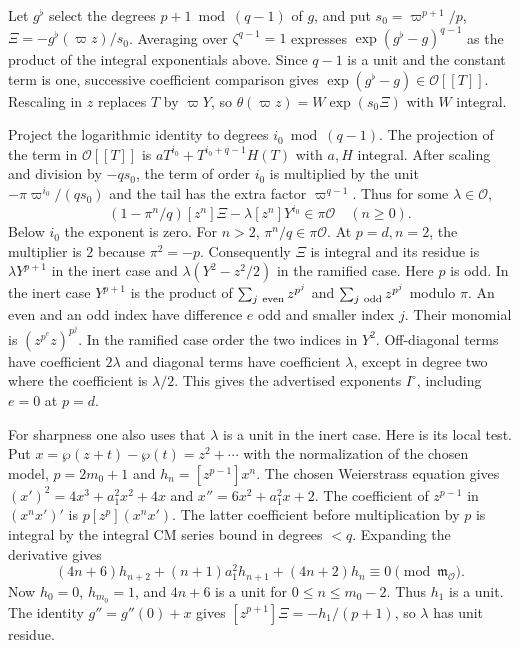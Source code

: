Let $g^\flat$ select the degrees $p+1\bmod(q-1)$ of $g$, and put
$s_0=\varpi^{p+1}/p$, $\Xi=-g^\flat(\varpi z)/s_0$.
Averaging over $\zeta^{q-1}=1$ expresses
$\exp(g^\flat-g)^{q-1}$ as the product of the integral exponentials above.
Since $q-1$ is a unit and the constant term is one, successive coefficient comparison gives $\exp(g^\flat-g)\in\mathcal O[[T]]$.
Rescaling in $z$ replaces $T$ by $\varpi Y$, so
$\theta(\varpi z)=W\exp(s_0\Xi)$ with $W$ integral.

Project the logarithmic identity to degrees $i_0\bmod(q-1)$.
The projection of the term in $\mathcal O[[T]]$ is $aT^{i_0}+T^{i_0+q-1}H(T)$ with $a,H$ integral. After scaling and division by $-qs_0$, the term of order $i_0$ is multiplied by the unit $-\pi\varpi^{i_0}/(qs_0)$ and the tail has the extra factor $\varpi^{q-1}$. Thus for some $\lambda\in\mathcal O$,
\[
 (1-\pi^n/q)[z^n]\Xi-\lambda[z^n]Y^{i_0}\in\pi\mathcal O
 \quad(n\ge0).
\]
Below $i_0$ the exponent is zero. For $n>2$, $\pi^n/q\in\pi\mathcal O$.
At $p=d,n=2$, the multiplier is $2$ because $\pi^2=-p$.
Consequently $\Xi$ is integral and its residue is
$\lambda Y^{p+1}$ in the inert case and $\lambda(Y^2-z^2/2)$ in the ramified case.
Here $p$ is odd. In the inert case $Y^{p+1}$ is the product of
$\sum_{j\ {\rm even}}z^{p^j}$ and $\sum_{j\ {\rm odd}}z^{p^j}$ modulo $\pi$.
An even and an odd index have difference $e$ odd and smaller index $j$.
Their monomial is $(z^{p^e}z)^{p^j}$. In the ramified case order the two indices in $Y^2$.
Off-diagonal terms have coefficient $2\lambda$ and diagonal terms have coefficient $\lambda$, except in degree two where the coefficient is $\lambda/2$.
This gives the advertised exponents $I^\circ$, including $e=0$ at $p=d$.

For sharpness one also uses that $\lambda$ is a unit in the inert case. Here is its local test.
Put $x=\wp(z+t)-\wp(t)=z^2+\cdots$ with the normalization of the chosen model,
$p=2m_0+1$ and $h_n=[z^{p-1}]x^n$. The chosen Weierstrass equation gives
$(x')^2=4x^3+a_1^2x^2+4x$ and $x''=6x^2+a_1^2x+2$.
The coefficient of $z^{p-1}$ in $(x^n x')'$ is $p[z^p](x^n x')$.
The latter coefficient before multiplication by $p$ is integral by the integral CM series bound in degrees $<q$. Expanding the derivative gives
\[
 (4n+6)h_{n+2}+(n+1)a_1^2h_{n+1}+(4n+2)h_n\equiv0
 \pmod{\mathfrak m_{\mathcal O}}.
\]
Now $h_0=0$, $h_{m_0}=1$, and $4n+6$ is a unit for $0\le n\le m_0-2$.
Thus $h_1$ is a unit. The identity $g''=g''(0)+x$ gives
$[z^{p+1}]\Xi=-h_1/(p+1)$, so $\lambda$ has unit residue.

